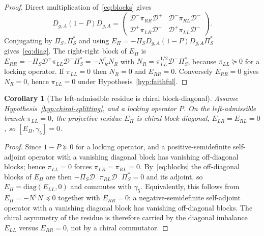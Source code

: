 \documentclass[11pt]{article}
\newtheorem{corollary}{Corollary}
\theoremstyle{definition}
\newcommand{\EPi}{E_\Pi}
\newcommand{\PiS}{\Pi_S}
\newcommand{\Deff}{\mathcal D}
\begin{document}
    \begin{proof}
      Direct multiplication of~\eqref{eq:blocks} gives
      \begin{equation*}
        D_{g,A}(1-P)D_{g,A}=
        \begin{pmatrix}\Deff^{-}\pi_{RR}\Deff^{+}&\Deff^{-}\pi_{RL}\Deff^{-}\\
          \Deff^{+}\pi_{LR}\Deff^{+}&\Deff^{+}\pi_{LL}\Deff^{-}\end{pmatrix}.
      \end{equation*}
      Conjugating by $\PiS,\PiS^{*}$ and using $\EPi=-\PiS D_{g,A}(1-P)D_{g,A}\PiS^{*}$
      gives~\eqref{eq:diag}.
      The right-right block of $\EPi$ is $E_{RR}=-\PiS\Deff^{+}\pi_{LL}\Deff^{-}\PiS^{*}=-N_R^{\dagger}N_R$ with
      $N_R=\pi_{LL}^{1/2}\Deff^{-}\PiS^{*}$, because $\pi_{LL}\succeq0$ for a locking operator.
      If $\pi_{LL}=0$ then $N_R=0$ and $E_{RR}=0$.
      Conversely $E_{RR}=0$ gives $N_R=0$, hence $\pi_{LL}=0$ under Hypothesis~\ref{hyp:faithful}.
    \end{proof}

    \begin{corollary}[The left-admissible residue is chiral block-diagonal]
      \label{cor:block-diagonal}
      Assume Hypothesis~\ref{hyp:chiral-splitting}, and a locking operator $P$.
      On the left-admissible branch $\pi_{LL}=0$, the projective residue $\EPi$ is chiral block-diagonal,
      $E_{LR}=E_{RL}=0$, so $[\EPi,\gamma_5]=0$.
    \end{corollary}

    \begin{proof}
      Since $1-P\succeq0$ for a locking operator, and a positive-semidefinite
      self-adjoint operator with a vanishing diagonal block has vanishing off-diagonal blocks; hence
      $\pi_{LL}=0$ forces $\pi_{LR}=\pi_{RL}=0$.
      By~\eqref{eq:blocks} the off-diagonal blocks of $\EPi$ are then $-\PiS\Deff^{-}\pi_{RL}\Deff^{-}\PiS^{*}=0$
      and its adjoint, so $\EPi=\mathrm{diag}(E_{LL},0)$ and commutes with $\gamma_5$.
      Equivalently, this follows from $\EPi=-N^{\dagger}N\preceq0$ together with $E_{RR}=0$:
      a negative-semidefinite self-adjoint operator with a vanishing diagonal block has vanishing off-diagonal
      blocks.
      The chiral asymmetry of the residue is therefore carried by the diagonal imbalance
      $E_{LL}$ versus $E_{RR}=0$, not by a chiral commutator.
    \end{proof}
\end{document}
